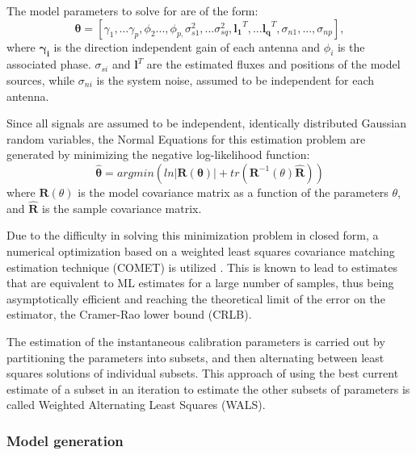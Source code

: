 \documentclass{aa}
\begin{document}
The model parameters to solve for are of the form:
\begin{equation}
\bm{\theta}=[\gamma_{1},\ldots\gamma_{p},\phi_{2}...,\phi_{p,}\sigma_{s1}^{2},...\sigma_{sq}^{2},\mathbf{l_{1}}^{T},...\mathbf{l_{q}}^{T},\sigma_{n1},...,\sigma_{np}],\label{eq:estparam}
\end{equation}
 where $\mathbf{\gamma_{i}}$  is the direction independent gain  of each antenna
 and $\phi_{i}$ is the  associated phase. $\sigma_{si}$ and $\mathbf{l}^{T}$ are
 the estimated fluxes and positions of the model sources, while $\sigma_{ni}$ is
 the system noise, assumed to be independent for each antenna.

Since  all  signals  are  assumed  to be  independent,  identically  distributed
Gaussian random variables, the Normal  Equations for this estimation problem are
generated by minimizing the negative log-likelihood function:
\begin{equation}
\bm{\hat{\theta}}=argmin\left(ln|\mathbf{R(\theta)}|+tr(\mathbf{R}^{-1}(\theta)\mathbf{\widehat{R}})\right)\label{eq:normeq}
\end{equation}
 where $\mathbf{R}(\theta)$ is the model  covariance matrix as a function of the
 parameters  $\theta$,  and  $\mathbf{\widehat{R}}$  is  the  sample  covariance
 matrix.

Due to  the difficulty in  solving this minimization  problem in closed  form, a
numerical  optimization based on  a weighted  least squares  covariance matching
estimation technique (COMET)  is utilized \citep{ottersten1998covariance}.  This
is known to  lead to estimates that  are equivalent to ML estimates  for a large
number  of  samples,  thus  being  asymptotically  efficient  and  reaching  the
theoretical  limit of the  error on  the estimator,  the Cramer-Rao  lower bound
(CRLB).

The estimation  of the  instantaneous calibration parameters  is carried  out by
partitioning  the parameters into  subsets, and  then alternating  between least
squares solutions of individual subsets. This approach of using the best current
estimate of a subset in an iteration to estimate the other subsets of parameters
is called Weighted Alternating Least Squares (WALS).


\subsubsection{\label{sub:Model-generation}Model generation}
\end{document}
